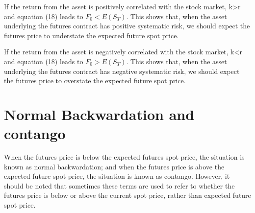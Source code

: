 \documentclass{article}
\begin{document}
If the return from the asset is positively correlated with the stock market, k>r and equation (18) leads to $ F_0<E(S_T) $. This shows that, when the asset underlying the futures contract has positive systematic risk, we should expect the futures price to understate the expected future spot price.

If the return from the asset is negatively correlated with the stock market, k<r and equation (18) leads to $ F_0>E(S_T) $. This shows that, when the asset underlying the futures contract has negative systematic risk, we should expect the futures price to overstate the expected future spot price.

\section{Normal Backwardation and contango}
When the futures price is below the expected futures spot price, the situation is known as normal backwardation; and when the futures price is above the expected future spot price, the situation is known as contango. However, it should be noted that sometimes these terms are used to  refer to whether the futures price is below or above the current spot price, rather than expected future spot price.
\end{document}
